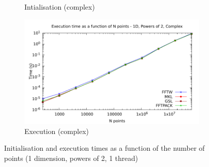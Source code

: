 \documentclass[12pt, a4paper]{article}
\begin{document}
\begin{figure}[H]
\begin{subfigure}{.5\textwidth}
\caption{Intialisation (complex)}
\label{1DPOW2CI}
\end{subfigure}%
\begin{subfigure}{.5\textwidth}
\centering
\includegraphics[width=.9\linewidth]{graphs/1d-pow2-exec-c.pdf}
\caption{Execution (complex)}
\label{1DPOW2C}
\end{subfigure}
\caption{Initialisation and execution times as a function of the number of points (1 dimension, powers of 2, 1 thread)}
\label{1DPOW2}
\end{figure}
\end{document}
